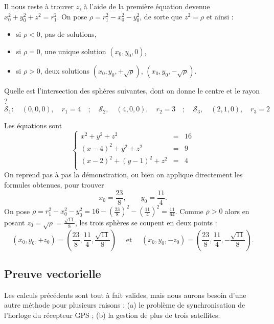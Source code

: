 \documentclass[class=report,crop=false]{standalone}
\begin{document}
Il nous reste à trouver $z$, à l'aide de la première équation devenue
$x_0^2 + y_0^2 +z^2 = r_1^2$.
On pose $\rho = r_1^2 - x_0^2 - y_0^2$, de sorte que 
$z^2 = \rho$ et ainsi :
\begin{itemize}
  \item si $\rho < 0$, pas de solutions,
  \item si $\rho = 0$, une unique solution $(x_0,y_0,0)$,
  \item si $\rho > 0$, deux solutions $(x_0,y_0,+\sqrt\rho)$,
  $(x_0,y_0,-\sqrt\rho)$.
\end{itemize}

\begin{exemple}
Quelle est l'intersection  des sphères suivantes, dont on donne le centre et le rayon ?
$$\mathcal{S}_1  : \quad (0,0,0), \quad r_1 = 4 \quad ; \quad 
\mathcal{S}_2, \quad (4,0,0), \quad r_2 = 3 \quad ; \quad 
\mathcal{S}_3, \quad (2,1,0), \quad r_3 = 2$$

Les équations sont
$$\left\{\begin{array}{rcl}
x^2 + y^2 + z^2 &=& 16 \\
(x-4)^2 + y^2 + z^2 &=& 9 \\
(x-2)^2 + (y-1)^2 + z^2 &=& 4 \\
\end{array}\right.$$
On reprend pas à pas la démonstration, ou bien on applique directement les formules obtenues, pour trouver
$$x_0 = \frac{23}{8}, \quad \quad y_0 = \frac{11}{4}.$$
On pose $\rho = r_1^2-x_0^2-y_0^2 = 
16 - \left(\frac{23}{8}\right)^2 - \left(\frac{11}{4}\right)^2
= \frac{11}{64}$.
Comme $\rho>0$ alors en posant
$z_0 = \sqrt\rho = \frac{\sqrt{11}}{8}$, 
les trois sphères se coupent en deux points :
$$(x_0,y_0,+z_0) = \left(\frac{23}{8},\frac{11}{4},\frac{\sqrt{11}}{8}\right) 
\quad \text{ et } \quad (x_0,y_0,-z_0)= \left(\frac{23}{8},\frac{11}{4},-\frac{\sqrt{11}}{8}\right) .$$
\end{exemple}



\subsection{Preuve vectorielle}

Les calculs précédents sont tout à fait valides, mais nous aurons besoin
d'une autre méthode pour plusieurs raisons : 
(a) le problème de synchronisation de l'horloge du récepteur GPS ;
(b) la gestion de plus de trois satellites.
\end{document}
